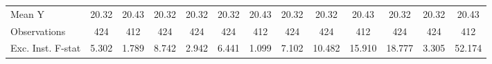 {\begin{tabular}{l*{12}{c}}
\midrule
Mean Y      &       20.32         &       20.43         &       20.32         &       20.32         &       20.32         &       20.43         &       20.32         &       20.32         &       20.43         &       20.32         &       20.32         &       20.43         \\
Observations&         424         &         412         &         424         &         424         &         424         &         412         &         424         &         424         &         412         &         424         &         424         &         412         \\
Exc. Inst. F-stat&       5.302         &       1.789         &       8.742         &       2.942         &       6.441         &       1.099         &       7.102         &      10.482         &      15.910         &      18.777         &       3.305         &      52.174         \\
\bottomrule
\end{tabular}
}
